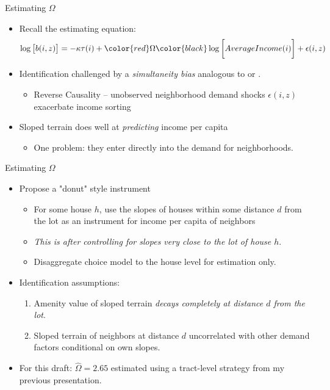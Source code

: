 \documentclass{beamer}
\begin{document}
\begin{frame}{Estimating $\Omega$}
		\begin{itemize}
		\color{black}
		\itemsep1em
		\item Recall the estimating equation: 
		\begin{equation*}
			\log\big[b(i, z)\big] = -\kappa\tau(i) + \color{red} \Omega \color{black} \log\bigg[AverageIncome(i)\bigg] + \epsilon(i, z)
		\end{equation*} \pause
		\item Identification challenged by a  \textit{simultaneity bias} analogous to \cite{diamond2016} or \cite{LeeandLin}.
		\begin{itemize}
			\item Reverse Causality -- unobserved neighborhood demand shocks $\epsilon(i, z)$ \color{red} exacerbate income sorting \pause
		\end{itemize} 
	 \item Sloped terrain does well at \textit{predicting} income per capita \citep{saiz2010} 
	 \begin{itemize}
	 	\item One problem: they enter directly into the demand for neighborhoods.
	 \end{itemize}
	\end{itemize}
\end{frame}

\begin{frame}{Estimating $\Omega$}
	\begin{itemize}			\color{black}	\itemsep1em
	\item Propose a "donut" style instrument \citep{BFMJPE}
	\begin{itemize}
	\itemsep1em
		\item For some house $h$, use the slopes of houses within some distance $d$ from the lot as an instrument for income per capita of neighbors
		
		\item \textit{This is after controlling for slopes very close to the lot of house $h$}.
		 
		\item Disaggregate choice model to the house level \color{red} for estimation only. \color{black} 
	\end{itemize} \pause
	\item Identification assumptions: 
	\begin{enumerate}
		\item Amenity value of sloped terrain  \textit{decays completely at distance $d$ from the lot}.
		\item Sloped terrain of neighbors at distance $d$ uncorrelated with other demand factors conditional on own slopes. 
	\end{enumerate} \pause
	\item For this draft: $\hat{\Omega} = 2.65$ estimated using a tract-level strategy from my previous presentation.
\end{itemize}
\end{frame}
\end{document}
